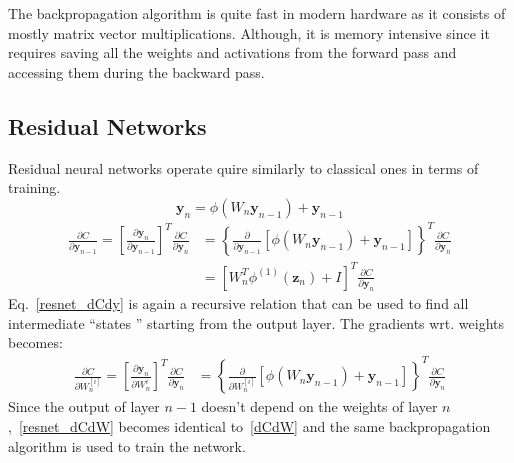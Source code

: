 \documentclass[11pt]{report}
\begin{document}
    The backpropagation algorithm is quite fast in modern hardware as it consists of mostly matrix vector multiplications.
    Although, it is memory intensive since it requires saving all the weights and activations from the forward pass and accessing them during the backward pass.

    \subsection{Residual Networks}
    Residual neural networks operate quire similarly to classical ones in terms of training.
    \begin{equation}
        \bm{y}_{n} = \phi( W_{n} \bm{y}_{n-1} ) + \bm{y}_{n-1}
    \end{equation}
    \begin{align}
        \label{resnet_dCdy}
        \frac{ \partial C}{\partial \textbf{y}_{n-1} }
        =
        \left[ \frac{ \partial \textbf{y}_{n}}{\partial \textbf{y}_{n-1}  } \right]^T
        \frac{ \partial C}{\partial \textbf{y}_{n} }
        &=
        \left\{
        \frac{ \partial }{\partial \textbf{y}_{n-1}}
        \left[
            \phi( W_n \textbf{y}_{n-1} ) + \textbf{y}_{n-1}
            \right]
        \right\}^T
        \frac{ \partial C}{ \partial \textbf{y}_{n} }
        \\
        &=
        \left[
            W_n^T \phi^{(1)}( \pmb{z}_n ) + I
            \right]^T
        \frac{ \partial C}{\partial \textbf{y}_{n} }
    \end{align}
    Eq.~\eqref{resnet_dCdy} is again a recursive relation that can be used to find all intermediate ``states '' starting from the output layer.
    The gradients wrt.
    weights becomes:
    \begin{align}
        \frac{ \partial C}{\partial W_n^{[i]} }
        =
        \left[ \frac{ \partial \pmb{y}_{n}}{\partial W_n^i } \right]^T
        \frac{ \partial C}{\partial \pmb{y}_{n} }
        &=
        \left\{
        \frac{ \partial }{\partial W_n^{[i]} }
        \left[
            \phi( W_{n} \bm{y}_{n-1} )  + \textbf{y}_{n-1}
            \right]
        \right\}^T
        \frac{ \partial C}{\partial \pmb{y}_{n} }
        \label{resnet_dCdW}
    \end{align}
    Since the output of layer $n-1$ doesn't depend on the weights of layer $n$,~\eqref{resnet_dCdW} becomes identical to~\eqref{dCdW} and the same backpropagation algorithm is used to train the network.
\end{document}
